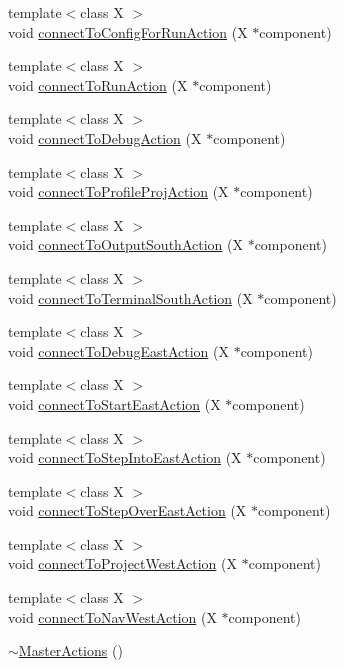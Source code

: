 \begin{DoxyCompactItemize}
\item 
{\footnotesize template$<$class X $>$ }\\void \hyperlink{class_master_actions_a87ff14d6fdf08f3730bb733747335dcb}{connect\-To\-Config\-For\-Run\-Action} (X $\ast$component)
\item 
{\footnotesize template$<$class X $>$ }\\void \hyperlink{class_master_actions_a73ec685aa0f239226bdda78857b9e234}{connect\-To\-Run\-Action} (X $\ast$component)
\item 
{\footnotesize template$<$class X $>$ }\\void \hyperlink{class_master_actions_a9c1baa889fbb545dc9607044839d5813}{connect\-To\-Debug\-Action} (X $\ast$component)
\item 
{\footnotesize template$<$class X $>$ }\\void \hyperlink{class_master_actions_afa0a093fb60aaeb8c6635e11ec89e121}{connect\-To\-Profile\-Proj\-Action} (X $\ast$component)
\item 
{\footnotesize template$<$class X $>$ }\\void \hyperlink{class_master_actions_a0ccac38f3166e1410f09f20e27b0d020}{connect\-To\-Output\-South\-Action} (X $\ast$component)
\item 
{\footnotesize template$<$class X $>$ }\\void \hyperlink{class_master_actions_a9f7d8a2bd25c903cbb62be5e9a9ce8fc}{connect\-To\-Terminal\-South\-Action} (X $\ast$component)
\item 
{\footnotesize template$<$class X $>$ }\\void \hyperlink{class_master_actions_a3806804210fcdd8f38d48a36c93bec07}{connect\-To\-Debug\-East\-Action} (X $\ast$component)
\item 
{\footnotesize template$<$class X $>$ }\\void \hyperlink{class_master_actions_ae3e0fee1df7d6e510b1e73bb12a3d5c9}{connect\-To\-Start\-East\-Action} (X $\ast$component)
\item 
{\footnotesize template$<$class X $>$ }\\void \hyperlink{class_master_actions_a544c64348ba067793868c5ba665e54c3}{connect\-To\-Step\-Into\-East\-Action} (X $\ast$component)
\item 
{\footnotesize template$<$class X $>$ }\\void \hyperlink{class_master_actions_abcc6be171bbe540db3e7ebdf7bfc5fbf}{connect\-To\-Step\-Over\-East\-Action} (X $\ast$component)
\item 
{\footnotesize template$<$class X $>$ }\\void \hyperlink{class_master_actions_ad8311d5ad31b045095be98a9e29db1bf}{connect\-To\-Project\-West\-Action} (X $\ast$component)
\item 
{\footnotesize template$<$class X $>$ }\\void \hyperlink{class_master_actions_a423adcfa52fc2f0441bef96ee6bd8c61}{connect\-To\-Nav\-West\-Action} (X $\ast$component)
\item 
\hyperlink{class_master_actions_a2504de3ca736a30530296fc9b44fb55b}{$\sim$\-Master\-Actions} ()
\end{DoxyCompactItemize}
